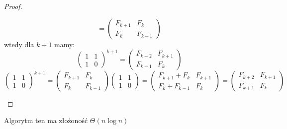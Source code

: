 \documentclass[11pt,a4paper]{article}
\begin{document}
\begin{itemize}
\begin{enumerate}
\begin{proof}
\begin{enumerate}
\[                                =
                                \begin{pmatrix}
                                    F_{k+1} & F_k \\
                                    F_k & F_{k-1}
                                \end{pmatrix}
                            \]
                            wtedy dla $k+1$ mamy:
                            \[
                                \begin{pmatrix}
                                    1 & 1 \\
                                    1 & 0
                                \end{pmatrix}^{k+1}
                                =
                                \begin{pmatrix}
                                    F_{k+2} & F_{k+1} \\
                                    F_{k+1} & F_k
                                \end{pmatrix}
                            \]
                            \[
                                \begin{pmatrix}
                                    1 & 1 \\
                                    1 & 0
                                \end{pmatrix}^{k+1}
                                =
                                \begin{pmatrix}
                                    F_{k+1} & F_k \\
                                    F_k & F_{k-1}
                                \end{pmatrix}
                                \begin{pmatrix}
                                    1 & 1 \\
                                    1 & 0
                                \end{pmatrix}
                                =
                                \begin{pmatrix}
                                    F_{k+1} + F_k & F_{k+1} \\
                                    F_k + F_{k-1} & F_k
                                \end{pmatrix}
                                =
                                \begin{pmatrix}
                                    F_{k+2} & F_{k+1} \\
                                    F_{k+1} & F_k
                                \end{pmatrix}
                            \]
                    \end{enumerate}
                \end{proof}
                Algorytm ten ma złożoność $\Theta(n\log n)$
        \end{enumerate}
\end{itemize}
\end{document}
